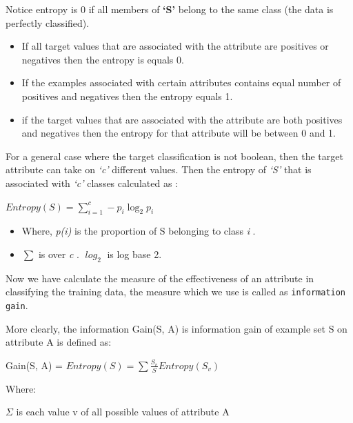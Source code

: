 \documentclass{report}
\begin{document}
Notice entropy is 0 if all members of \textbf{`S'} belong to the same class (the
data is perfectly classified). \\


\begin{itemize}

\item If all target values that are associated with the attribute  are positives or negatives then the entropy is equals 0.
\item If the examples associated with certain attributes contains equal number of positives and negatives then the entropy equals 1.

\item if the target values that are associated with the attribute are both positives and negatives then the entropy for that attribute will be between 0 and 1.
\end{itemize}
\pagebreak

For a general case where the target classification is not boolean, then the target attribute can take on \emph{`c'} different values. Then the entropy of \emph{`S'} that is associated with \emph{`c'} classes calculated as :

{\centering
 $\mathit{Entropy}(S)=\sum\limits_{i=1}^c-p_i\log _{2}p_i$ 
\par}

\begin{itemize}

\item Where, \textit{p(i)} is the proportion of S belonging to class \textit{i} .
\item $\mathit{\sum }$ is over \textit{c} . $\mathit{\log_{2}}$ is log base 2.

\end{itemize}

Now we have calculate the measure of the effectiveness of an attribute in classifying the training data, the measure which we use is called as \texttt{information gain}.

More clearly, the information Gain(S, A) is information gain of example set S on attribute A is
defined as:\\

{\centering

Gain(S, A) = $\mathit{Entropy}(S)=\sum\frac{S_v}{S} Entropy (S_v)$


\par}

Where:

${\Sigma}$ is each value v of all possible values of attribute A
\end{document}
